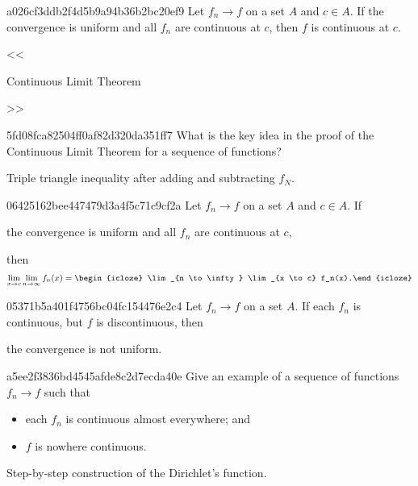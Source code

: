 \begin{note}{a026cf3ddb2f4d5b9a94b36b2bc20ef9}
    Let \({ f_n \to f }\) on a set \({ A }\) and \({ c \in A }\).
    If the convergence is uniform and all \({ f_n }\) are continuous at \({ c }\), then \({ f }\) is continuous at \({ c }\).

    \begin{center}
        \tiny
        <<\begin{icloze}{1}Continuous Limit Theorem\end{icloze}>>
    \end{center}
\end{note}

\begin{note}{5fd08fca82504ff0af82d320da351ff7}
    What is the key idea in the proof of the Continuous Limit Theorem for a sequence of functions?

    \begin{cloze}{1}
        Triple triangle inequality after adding and subtracting \({ f_N }\).
    \end{cloze}
\end{note}

\begin{note}{06425162bee447479d3a4f5c71c9cf2a}
    Let \({ f_n \to f }\) on a set \({ A }\) and \({ c \in A }\).
    If \begin{icloze}{1}the convergence is uniform and all \({ f_n }\) are continuous at \({ c }\),\end{icloze} then
    \[
        \lim_{x \to c} \lim_{n \to \infty} f_n(x) = \begin{icloze}{2}\lim_{n \to \infty} \lim_{x \to c} f_n(x).\end{icloze}
    \]
\end{note}

\begin{note}{05371b5a401f4756bc04fc154476e2c4}
    Let \({ f_n \to f }\) on a set \({ A }\).
    If each \({ f_n }\) is continuous, but \({ f }\) is discontinuous, then \begin{icloze}{1}the convergence is not uniform.\end{icloze}
\end{note}

\begin{note}{a5ee2f3836bd4545afde8c2d7ecda40e}
    Give an example of a sequence of functions \({ f_n \to f }\) such that
    \begin{itemize}
        \item each \({ f_n }\) is continuous almost everywhere; and
        \item \({ f }\) is nowhere continuous.
    \end{itemize}

    \begin{cloze}{1}
        Step-by-step construction of the Dirichlet's function.
    \end{cloze}
\end{note}

